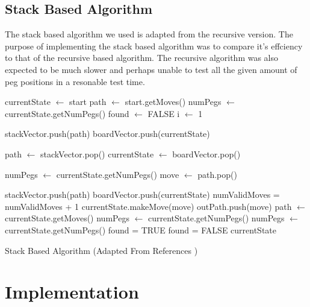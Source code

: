 \documentclass[a4paper]{article}
\begin{document}
\subsection{Stack Based Algorithm}
The stack based algorithm we used is adapted from the recursive version. The purpose of implementing the stack based algorithm was to compare it's effciency to that of the recursive based algorithm. The recursive algorithm was also expected to be much slower and perhaps unable to test all the given amount of peg positions in a resonable test time.

\begin{algorithm}[H]
	\begin{algorithmic}[1]
			\State currentState $\leftarrow$ start
			\State path $\leftarrow$ start.getMoves()
			\State numPegs $\leftarrow$ currentState.getNumPegs()
			\State found $\leftarrow$ FALSE
			\State i $\leftarrow$ 1

			\State stackVector.push(path)
			\State boardVector.push(currentState)

				\State path $\leftarrow$ stackVector.pop()
				\State currentState $\leftarrow$ boardVector.pop()

					\State numPegs $\leftarrow$ currentState.getNumPegs()
					\State move $\leftarrow$ path.pop()

						\State stackVector.push(path)
						\State boardVector.push(currentState)
						\State numValidMoves = numValidMoves + 1
						\State currentState.makeMove(move)
						\State outPath.push(move)
						\State path $\leftarrow$ currentState.getMoves()
						\State numPegs $\leftarrow$ currentState.getNumPegs()
					\EndIf
				\EndWhile
				\State numPegs $\leftarrow$ currentState.getNumPegs()
					\State found = TRUE
				\Else
					\State found = FALSE
				\EndIf
			\EndWhile
			\Return currentState
		\EndProcedure
	\end{algorithmic}
	\caption{Stack Based Algorithm (Adapted From References \cite{lab5})}\label{euclid}
\end{algorithm}

\section{Implementation}
\end{document}
